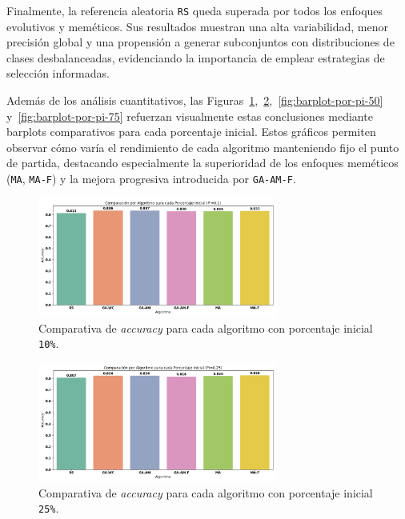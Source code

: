 Finalmente, la referencia aleatoria \texttt{RS} queda superada por todos los enfoques evolutivos y meméticos.
Sus resultados muestran una alta variabilidad, menor precisión global y una propensión a generar subconjuntos con distribuciones de clases desbalanceadas,
evidenciando la importancia de emplear estrategias de selección informadas.

Además de los análisis cuantitativos, las Figuras~\ref{fig:barplot-por-pi-10},~\ref{fig:barplot-por-pi-25},~\ref{fig:barplot-por-pi-50} y~\ref{fig:barplot-por-pi-75}
refuerzan visualmente estas conclusiones mediante barplots comparativos para cada porcentaje inicial.
Estos gráficos permiten observar cómo varía el rendimiento de cada algoritmo manteniendo fijo el punto de partida,
destacando especialmente la superioridad de los enfoques meméticos (\texttt{MA}, \texttt{MA-F}) y la mejora progresiva introducida por \texttt{GA-AM-F}.

\begin{figure}[htp]
  \centering
  \includegraphics[width=0.7\textwidth]{imagenes/evaluaciones/final/barplot-por-pi/pi-10.png}
  \caption{Comparativa de \textit{accuracy} para cada algoritmo con porcentaje inicial \texttt{10\%}.}
  \label{fig:barplot-por-pi-10}
\end{figure}

\begin{figure}[htp]
  \centering
  \includegraphics[width=0.7\textwidth]{imagenes/evaluaciones/final/barplot-por-pi/pi-25.png}
  \caption{Comparativa de \textit{accuracy} para cada algoritmo con porcentaje inicial \texttt{25\%}.}
  \label{fig:barplot-por-pi-25}
\end{figure}

